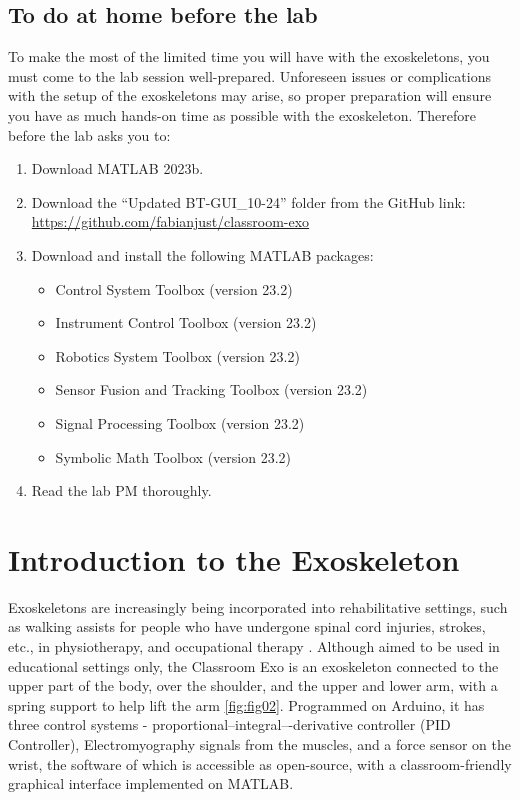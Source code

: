 \subsection{To do at home before the lab}
To make the most of the limited time you will have with the exoskeletons, you must come to the lab session well-prepared. Unforeseen issues or complications with the setup of the exoskeletons may arise, so proper preparation will ensure you have as much hands-on time as possible with the exoskeleton. Therefore before the lab asks you to:  
\begin{enumerate}[]
	\item Download MATLAB 2023b.
	\item Download the “Updated BT-GUI\_10-24”  folder from the GitHub link: \url{https://github.com/fabianjust/classroom-exo}
	\item Download and install the following MATLAB packages: 
	\begin{itemize}[]
		\item Control System Toolbox (version 23.2)
		\item Instrument Control Toolbox (version 23.2)
		\item Robotics System Toolbox (version 23.2)
		\item Sensor Fusion and Tracking Toolbox (version 23.2)
		\item Signal Processing Toolbox (version 23.2)
		\item Symbolic Math Toolbox (version 23.2)
	\end{itemize}
	\item Read the lab PM thoroughly.
\end{enumerate}


\newpage

\section{Introduction to the Exoskeleton}
Exoskeletons are increasingly being incorporated into rehabilitative settings, such as walking assists for people who have undergone spinal cord injuries, strokes, etc., in physiotherapy, and occupational therapy \cite{Hill2017}. Although aimed to be used in educational settings only, the Classroom Exo is an exoskeleton connected to the upper part of the body, over the shoulder, and the upper and lower arm, with a spring support to help lift the arm \autoref{fig:fig02}. Programmed on Arduino, it has three control systems - proportional–integral–-derivative controller (PID Controller), Electromyography signals from the muscles, and a force sensor on the wrist, the software of which is accessible as open-source, with a classroom-friendly graphical interface implemented on MATLAB. 

